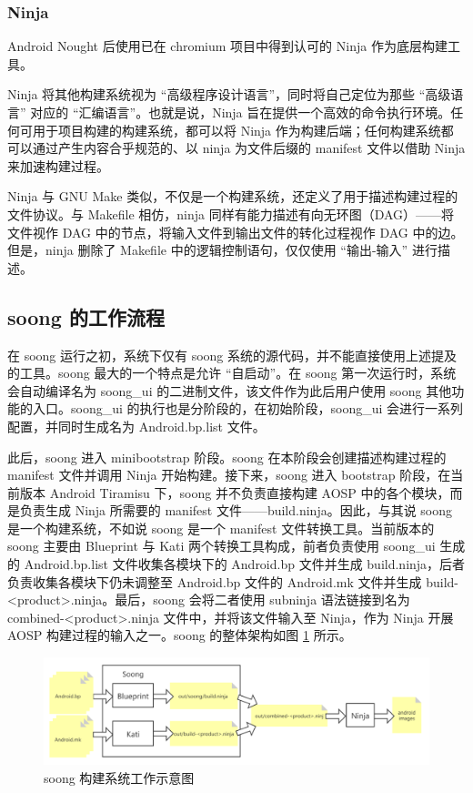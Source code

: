 \subsubsection{Ninja}

Android Nought 后使用已在 chromium 项目中得到认可的 Ninja 作为底层构建工具。

Ninja 将其他构建系统视为 “高级程序设计语言”，同时将自己定位为那些 “高级语言” 对应的 “汇编语言”\cite{NINJABUILD}。也就是说，Ninja 旨在提供一个高效的命令执行环境。任何可用于项目构建的构建系统，都可以将 Ninja 作为构建后端；任何构建系统都可以通过产生内容合乎规范的、以 ninja 为文件后缀的 manifest 文件以借助 Ninja 来加速构建过程。

Ninja 与 GNU Make 类似，不仅是一个构建系统，还定义了用于描述构建过程的文件协议。与 Makefile 相仿，ninja 同样有能力描述有向无环图（DAG）——将文件视作 DAG 中的节点，将输入文件到输出文件的转化过程视作 DAG 中的边。但是，ninja 删除了 Makefile 中的逻辑控制语句，仅仅使用 “输出-输入” 进行描述。

\subsection{soong 的工作流程}

在 soong 运行之初，系统下仅有 soong 系统的源代码，并不能直接使用上述提及的工具。soong 最大的一个特点是允许 “自启动”。在 soong 第一次运行时，系统会自动编译名为 soong\_ui 的二进制文件，该文件作为此后用户使用 soong 其他功能的入口。soong\_ui 的执行也是分阶段的，在初始阶段，soong\_ui 会进行一系列配置，并同时生成名为 Android.bp.list 文件。

此后，soong 进入 minibootstrap 阶段。soong 在本阶段会创建描述构建过程的 manifest 文件并调用 Ninja 开始构建。接下来，soong 进入 bootstrap 阶段，在当前版本 Android Tiramisu 下，soong 并不负责直接构建 AOSP 中的各个模块，而是负责生成 Ninja 所需要的 manifest 文件——build.ninja。因此，与其说 soong 是一个构建系统，不如说 soong 是一个 manifest 文件转换工具。当前版本的 soong 主要由 Blueprint 与 Kati 两个转换工具构成，前者负责使用 soong\_ui 生成的 Android.bp.list 文件收集各模块下的 Android.bp 文件并生成 build.ninja，后者负责收集各模块下仍未调整至 Android.bp 文件的 Android.mk 文件并生成 build-<product>.ninja。最后，soong 会将二者使用 subninja 语法链接到名为 combined-<product>.ninja 文件中，并将该文件输入至 Ninja，作为 Ninja 开展 AOSP 构建过程的输入之一。soong 的整体架构如图 \ref{fig:soong-architecture} 所示。

\begin{figure}
    \centering
    \includegraphics[width=.8\textwidth]{figures/soong-arch.png}
    \caption{soong 构建系统工作示意图}
    \label{fig:soong-architecture}
\end{figure}